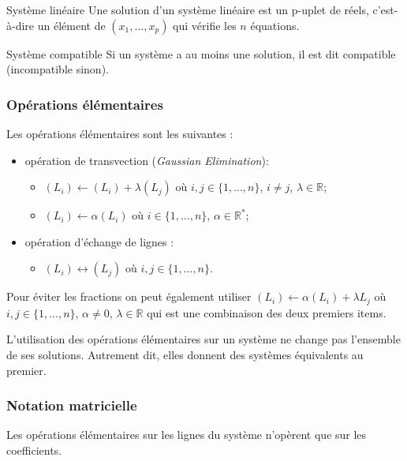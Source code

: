 \begin{defi}{Système linéaire}
Une solution d'un système linéaire est un p-uplet de réels, c'est-à-dire un élément de $(x_1,...,x_p)$ qui vérifie les $n$ équations. 
\end{defi}


\begin{defi}{Système compatible}
Si un système a au moins une solution, il est dit compatible (incompatible sinon).
\end{defi}


\subsubsection{Opérations élémentaires}
\begin{defi}{}
Les opérations élémentaires sont les suivantes :
\begin{itemize}
\item opération de transvection (\textit{Gaussian Elimination}): 
\begin{itemize}
\item $(L_i)\leftarrow (L_i)+\lambda (L_j)$ où $i,j\in \{1,...,n\}$, $i\neq j$, $\lambda \in \mathbb{R}$;
\item $(L_i)\leftarrow \alpha (L_i)$ où $i\in \{1,...,n\}$, $\alpha \in \mathbb{R}^*$;
\end{itemize}
\item opération d'échange de lignes : 
\begin{itemize}
\item $(L_i)\leftrightarrow  (L_j)$ où $i,j\in \{1,...,n\}$. 
\end{itemize}
\end{itemize}
\end{defi}

\begin{rem}
Pour éviter les fractions on peut également utiliser $(L_i)\leftarrow \alpha (L_i) + \lambda L_j$ où $i,j\in \{1,...,n\}$, $\alpha \neq 0$, $\lambda \in \mathbb{R}$ qui est une combinaison des deux premiers items.
\end{rem}

\begin{proposition}
L'utilisation des opérations élémentaires sur un système ne change pas l'ensemble de ses solutions. Autrement dit, elles donnent des systèmes équivalents au premier.
\end{proposition}

\subsubsection{Notation matricielle}
\begin{rem}
Les opérations élémentaires sur les lignes du système n'opèrent que sur les coefficients. 
\end{rem}


